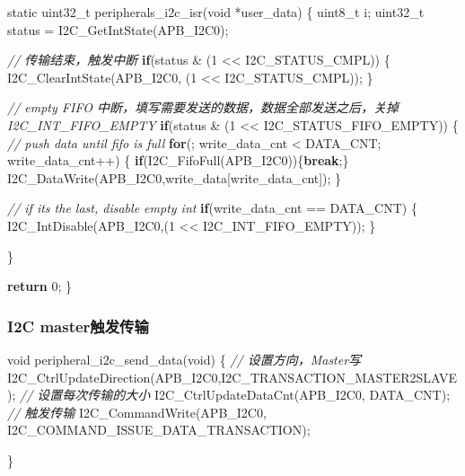 \documentclass[
  12pt,
]{book}
\newenvironment{Shaded}{\begin{snugshade}}{\end{snugshade}}
\newcommand{\CommentTok}[1]{\textcolor[rgb]{0.56,0.35,0.01}{\textit{#1}}}
\newcommand{\ControlFlowTok}[1]{\textcolor[rgb]{0.13,0.29,0.53}{\textbf{#1}}}
\newcommand{\DataTypeTok}[1]{\textcolor[rgb]{0.13,0.29,0.53}{#1}}
\newcommand{\DecValTok}[1]{\textcolor[rgb]{0.00,0.00,0.81}{#1}}
\newcommand{\NormalTok}[1]{#1}
\begin{document}
\begin{Shaded}
\begin{Highlighting}[]
\DataTypeTok{static} \DataTypeTok{uint32_t}\NormalTok{ peripherals_i2c_isr(}\DataTypeTok{void}\NormalTok{ *user_data)}
\NormalTok{\{}
  \DataTypeTok{uint8_t}\NormalTok{ i;}
  \DataTypeTok{uint32_t}\NormalTok{ status = I2C_GetIntState(APB_I2C0);}
  
  \CommentTok{// 传输结束，触发中断}
  \ControlFlowTok{if}\NormalTok{(status & (}\DecValTok{1}\NormalTok{ << I2C_STATUS_CMPL))}
\NormalTok{  \{}
\NormalTok{    I2C_ClearIntState(APB_I2C0, (}\DecValTok{1}\NormalTok{ << I2C_STATUS_CMPL));}
\NormalTok{  \}}
  
  \CommentTok{// empty FIFO 中断，填写需要发送的数据，数据全部发送之后，关掉I2C_INT_FIFO_EMPTY}
  \ControlFlowTok{if}\NormalTok{(status & (}\DecValTok{1}\NormalTok{ << I2C_STATUS_FIFO_EMPTY))}
\NormalTok{  \{}
    \CommentTok{// push data until fifo is full}
    \ControlFlowTok{for}\NormalTok{(; write_data_cnt < DATA_CNT; write_data_cnt++)}
\NormalTok{    \{}
      \ControlFlowTok{if}\NormalTok{(I2C_FifoFull(APB_I2C0))\{}\ControlFlowTok{break}\NormalTok{;\}}
\NormalTok{      I2C_DataWrite(APB_I2C0,write_data[write_data_cnt]);}
\NormalTok{    \}}
    
    \CommentTok{// if its the last, disable empty int}
    \ControlFlowTok{if}\NormalTok{(write_data_cnt == DATA_CNT)}
\NormalTok{    \{}
\NormalTok{      I2C_IntDisable(APB_I2C0,(}\DecValTok{1}\NormalTok{ << I2C_INT_FIFO_EMPTY));}
\NormalTok{    \}}

\NormalTok{  \}}
  
  \ControlFlowTok{return} \DecValTok{0}\NormalTok{;}
\NormalTok{\}}
\end{Highlighting}
\end{Shaded}

\hypertarget{i2c-masterux89e6ux53d1ux4f20ux8f93-1}{%
\subsubsection{I2C master触发传输}\label{i2c-masterux89e6ux53d1ux4f20ux8f93-1}}

\begin{Shaded}
\begin{Highlighting}[]
\DataTypeTok{void}\NormalTok{ peripheral_i2c_send_data(}\DataTypeTok{void}\NormalTok{)}
\NormalTok{\{}
  \CommentTok{// 设置方向，Master写}
\NormalTok{  I2C_CtrlUpdateDirection(APB_I2C0,I2C_TRANSACTION_MASTER2SLAVE);}
  \CommentTok{// 设置每次传输的大小}
\NormalTok{  I2C_CtrlUpdateDataCnt(APB_I2C0, DATA_CNT);}
  \CommentTok{// 触发传输}
\NormalTok{  I2C_CommandWrite(APB_I2C0, I2C_COMMAND_ISSUE_DATA_TRANSACTION);}
  
\NormalTok{\}}
\end{Highlighting}
\end{Shaded}
\end{document}
